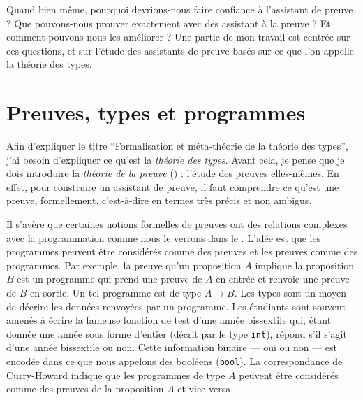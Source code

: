 Quand bien même, pourquoi devrions-nous faire confiance à l'assistant de
preuve ? Que pouvons-nous prouver exactement avec des assistant à la preuve ?
Et comment pouvons-nous les améliorer ?
Une partie de mon travail est centrée sur ces questions, et sur l'étude des
assistants de preuve basés sur ce que l'on appelle la théorie des types.

\section{Preuves, types et programmes}

Afin d'expliquer le titre ``Formalisation et méta-théorie de la théorie des
types'', j'ai besoin d'expliquer ce qu'est la \emph{théorie des types}.
Avant cela, je pense que je dois introduire la \emph{théorie de la preuve}
() : l'étude des preuves elles-mêmes.
En effet, pour construire un assistant de preuve, il faut comprendre ce qu'est
une preuve, formellement, c'est-à-dire en termes très précis et non ambigus.

Il s'avère que certaines notions formelles de preuves ont des relations complexes avec la programmation comme nous le verrons dans le .
L'idée est que les programmes peuvent être considérés comme des preuves et les
preuves comme des programmes.
Par exemple, la preuve qu'un proposition \(A\) implique la proposition \(B\)
est un programme qui prend une preuve de \(A\) en entrée et renvoie une preuve
de \(B\) en sortie.
Un tel programme est de type \(A \to B\). Les types sont un moyen de décrire les
données renvoyées par un programme. Les étudiants sont souvent amenés à écrire
la fameuse fonction de test d'une année bissextile qui, étant donnée une année
sous forme d'entier (décrit par le type \texttt{int}), répond s'il
s'agit d'une année bissextile ou non. Cette information binaire --- oui ou non
--- est encodée dans ce que nous appelons des booléens
(\texttt{bool}).
La correspondance de Curry-Howard indique que les programmes de type \(A\)
peuvent être considérés comme des preuves de la proposition \(A\) et vice-versa.

